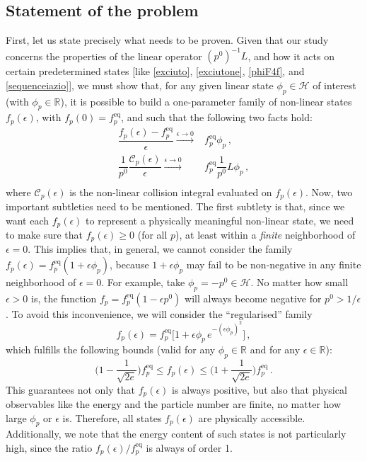 \documentclass[a4paper, amsfonts, amssymb, amsmath, reprint, showkeys, nofootinbib, twoside, onecolumn,notitlepage,,longbibliography]{revtex4-2}
\theoremstyle{definition}
\theoremstyle{theorem}
\theoremstyle{corollary}
\begin{document}
\subsection{Statement of the problem}\label{statemente}

First, let us state precisely what needs to be proven. Given that our study concerns the properties of the linear operator $(p^0)^{-1}L$, and how it acts on certain predetermined states [like \eqref{exciuto}, \eqref{exciutone}, \eqref{phiF4f}, and \eqref{sequenceiazio}], we must show that, for any given linear state $\phi_p \in \mathcal{H}$ of interest (with $\phi_p \in \mathbb{R}$), it is possible to build a one-parameter family of non-linear states $f_p(\epsilon)$, with $f_p(0)=f^\text{eq}_p$, and such that the following two facts hold:
\begin{equation}\label{grinizo}
\begin{split}
\dfrac{f_p(\epsilon){-}f^{\text{eq}}_p}{\epsilon} \xrightarrow{\epsilon \rightarrow 0} {}&f^{\text{eq}}_p \phi_p \, , \\
\dfrac{1}{p^0}\dfrac{\mathcal{C}_p(\epsilon)}{\epsilon} \xrightarrow{\epsilon \rightarrow 0} {}& f^{\text{eq}}_p \dfrac{1}{p^0} L\phi_p \, , \\
\end{split}
\end{equation}
where $\mathcal{C}_p(\epsilon)$ is the non-linear collision integral evaluated on $f_p(\epsilon)$. Now, two important subtleties need to be mentioned. The first subtlety is that, since we want each $f_p(\epsilon)$ to represent a physically meaningful non-linear state, we need to make sure that $f_p(\epsilon) \geq 0$ (for all $p$), at least within a \textit{finite} neighborhood of $\epsilon=0$. This implies that, in general, we cannot consider the family $f_p(\epsilon)=f^{\text{eq}}_p(1{+}\epsilon \phi_p)$, because $1{+}\epsilon \phi_p$ may fail to be non-negative in any finite neighborhood of $\epsilon=0$. For example, take $\phi_p=-p^0 \in \mathcal{H}$. No matter how small $\epsilon>0$ is, the function $f_p =f_p^{\text{eq}}(1-\epsilon p^0)$ will always become negative for $p^0>1/\epsilon$. To avoid this inconvenience, we will consider the ``regularised'' family
\begin{equation}\label{regularizzzzzed}
f_p(\epsilon)=f^\text{eq}_p \bigg[1+\epsilon \phi_p \, e^{-(\epsilon \phi_p)^2}\bigg] \, ,
\end{equation}
which fulfills the following bounds (valid for any $\phi_p \in \mathbb{R}$ and for any $\epsilon \in \mathbb{R}$): 
\begin{equation}
\bigg(1{-}\dfrac{1}{\sqrt{2e}} \bigg) f^\text{eq}_p \leq f_p(\epsilon) \leq \bigg(1{+}\dfrac{1}{\sqrt{2e}} \bigg) f^\text{eq}_p \, . 
\end{equation}
This guarantees not only that $f_p(\epsilon)$ is always positive, but also that physical observables like the energy and the particle number are finite, no matter how large $\phi_p$ or $\epsilon$ is. Therefore, all states $f_p(\epsilon)$ are physically accessible. Additionally, we note that the energy content of such states is not particularly high, since the ratio $f_p(\epsilon)/f^\text{eq}_p$ is always of order 1.
\end{document}
